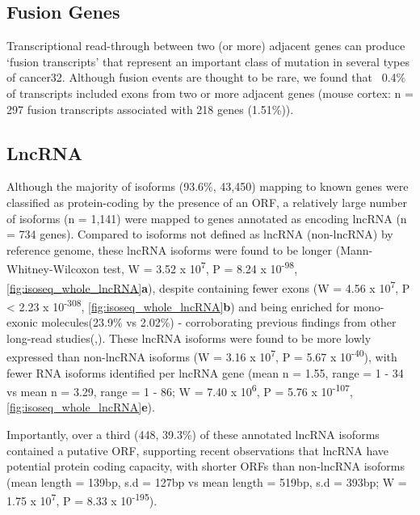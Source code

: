 \subsection{Fusion Genes}
Transcriptional read-through between two (or more) adjacent genes can produce ‘fusion transcripts’ that represent an important class of mutation in several types of cancer32. Although fusion events are thought to be rare, we found that ~0.4\% of transcripts included exons from two or more adjacent genes (mouse cortex: n = 297 fusion transcripts associated with 218 genes (1.51\%)). 


\subsection{LncRNA}
Although the majority of isoforms (93.6\%, 43,450) mapping to known genes were classified as protein-coding by the presence of an ORF, a relatively large number of isoforms (n = 1,141) were mapped to genes annotated as encoding lncRNA (n = 734 genes). Compared to isoforms not defined as lncRNA (non-lncRNA) by reference genome, these lncRNA isoforms were found to be longer (Mann-Whitney-Wilcoxon test, W = 3.52 x 10\textsuperscript{7}, P = 8.24 x 10\textsuperscript{-98}, \cref{fig:isoseq_whole_lncRNA}\textbf{a}), despite containing fewer exons (W = 4.56 x 10\textsuperscript{7}, P < 2.23 x 10\textsuperscript{-308}, \cref{fig:isoseq_whole_lncRNA}\textbf{b}) and being enriched for mono-exonic molecules(23.9\% vs 2.02\%) - corroborating previous findings from other long-read studies(\cite{Derrien2012},\cite{Tilgner2015}). These lncRNA isoforms were found to be more lowly expressed than non-lncRNA isoforms (W = 3.16 x 10\textsuperscript{7}, P = 5.67 x 10\textsuperscript{-40}), with fewer RNA isoforms identified per lncRNA gene (mean n = 1.55, range = 1 - 34 vs mean n = 3.29, range = 1 - 86; W = 7.40 x 10\textsuperscript{6}, P = 5.76 x 10\textsuperscript{-107}, \cref{fig:isoseq_whole_lncRNA}\textbf{e}). 

Importantly, over a third (448, 39.3\%) of these annotated lncRNA isoforms contained a putative ORF, supporting recent observations that lncRNA have potential protein coding capacity, with shorter ORFs than non-lncRNA isoforms (mean length = 139bp, s.d = 127bp vs mean length = 519bp, s.d = 393bp; W = 1.75 x 10\textsuperscript{7}, P = 8.33 x 10\textsuperscript{-195}). 

